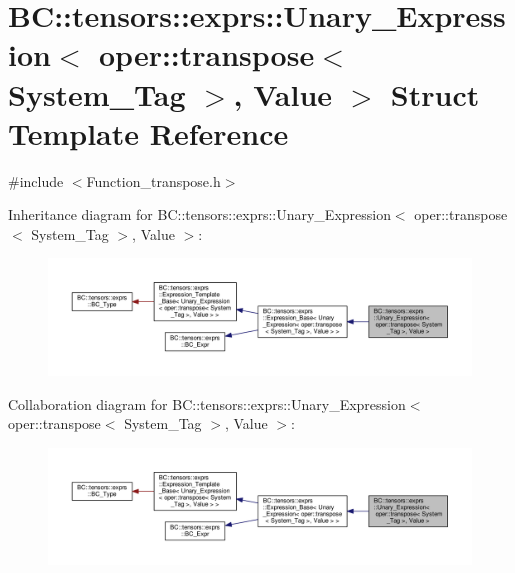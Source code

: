 \hypertarget{structBC_1_1tensors_1_1exprs_1_1Unary__Expression_3_01oper_1_1transpose_3_01System__Tag_01_4_00_01Value_01_4}{}\section{BC\+:\+:tensors\+:\+:exprs\+:\+:Unary\+\_\+\+Expression$<$ oper\+:\+:transpose$<$ System\+\_\+\+Tag $>$, Value $>$ Struct Template Reference}
\label{structBC_1_1tensors_1_1exprs_1_1Unary__Expression_3_01oper_1_1transpose_3_01System__Tag_01_4_00_01Value_01_4}


{\ttfamily \#include $<$Function\+\_\+transpose.\+h$>$}



Inheritance diagram for BC\+:\+:tensors\+:\+:exprs\+:\+:Unary\+\_\+\+Expression$<$ oper\+:\+:transpose$<$ System\+\_\+\+Tag $>$, Value $>$\+:
\nopagebreak
\begin{figure}[H]
\begin{center}
\leavevmode
\includegraphics[width=350pt]{structBC_1_1tensors_1_1exprs_1_1Unary__Expression_3_01oper_1_1transpose_3_01System__Tag_01_4_00_01Value_01_4__inherit__graph}
\end{center}
\end{figure}


Collaboration diagram for BC\+:\+:tensors\+:\+:exprs\+:\+:Unary\+\_\+\+Expression$<$ oper\+:\+:transpose$<$ System\+\_\+\+Tag $>$, Value $>$\+:
\nopagebreak
\begin{figure}[H]
\begin{center}
\leavevmode
\includegraphics[width=350pt]{structBC_1_1tensors_1_1exprs_1_1Unary__Expression_3_01oper_1_1transpose_3_01System__Tag_01_4_00_01Value_01_4__coll__graph}
\end{center}
\end{figure}
